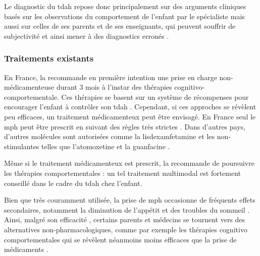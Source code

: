 Le diagnostic du \gls{tdah} repose donc principalement sur des arguments cliniques basés sur les observations du comportement de l'enfant par le spécialiste 
mais aussi sur celles de ses parents et de ses enseignants, qui peuvent souffrir de
subjectivité et ainsi mener à des diagnostics erronés \citep{Lambez2019}.

\subsubsection{Traitements existants} \label{traitements_existants}

En France, la \citet{HAS} recommande en première intention une prise en charge non-médicamenteuse durant 3 mois à l'instar des thérapies cognitivo-comportementale. 
Ces thérapies se basent sur un système de récompenses pour encourager l'enfant à contrôler son \gls{tdah} \citep{Evans2011, Sonuga2004}.
Cependant, si ces approches se révèlent peu efficaces, un traitement médicamenteux peut être envisagé. En France seul le \gls{mph}
peut être prescrit en suivant des règles très strictes \citep{HAS}. Dans d'autres pays, d'autres molécules sont autorisées comme la lisdexamfetamine et 
les non-stimulantes telles que l'atomoxetine et la guanfacine \citep{Luan2017}.

Même si le traitement médicamenteux est prescrit, la \citet{HAS} recommande de poursuivre les thérapies comportementales : un tel traitement multimodal 
est fortement conseillé dans le cadre du \gls{tdah} chez l'enfant.

Bien que très couramment utilisée,  la prise de \gls{mph} occasionne de fréquents effets secondaires,
notamment la diminution de l'appétit et des troubles du sommeil \citep{Sousa2012}. Ainsi, malgré son efficacité \citep{Taylor2014,
Storebo2015, Swanson2017}, certains parents et médecins se tournent vers des alternatives non-pharmacologiques, comme par exemple les thérapies cognitivo 
comportementales \citep{Berger2008} qui se révèlent néanmoins
moins efficaces que la prise de médicaments \citep{Sonuga-Barke2013}. 

